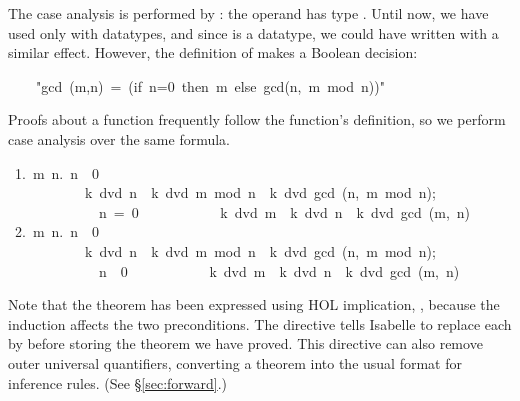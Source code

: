 The case analysis is performed by : the operand has type
.  Until now, we have used  only with datatypes, and since
 is a datatype, we could have written
 with a similar effect.  However, the definition of 
makes a Boolean decision:
\begin{isabelle}
\ \ \ \ "gcd\ (m,n)\ =\ (if\ n=0\ then\ m\ else\ gcd(n,\ m\ mod\ n))"
\end{isabelle}
Proofs about a function frequently follow the function's definition, so we perform
case analysis over the same formula.

\begingroup\samepage
\begin{isabelle}
\ 1.\ \isasymAnd m\ n.\ \isasymlbrakk n\ \isasymnoteq \ 0\ \isasymlongrightarrow \isanewline
\ \ \ \ \ \ \ \ \ \ \ k\ dvd\ n\ \isasymlongrightarrow \ k\ dvd\ m\ mod\ n\ \isasymlongrightarrow \ k\ dvd\ gcd\ (n,\ m\ mod\ n);\isanewline
\ \ \ \ \ \ \ \ \ \ \ \ \ n\ =\ 0\isasymrbrakk \isanewline
\ \ \ \ \ \ \ \ \ \ \isasymLongrightarrow \ k\ dvd\ m\ \isasymlongrightarrow \ k\ dvd\ n\ \isasymlongrightarrow \ k\ dvd\ gcd\ (m,\ n)
\pagebreak[0]\isanewline
\ 2.\ \isasymAnd m\ n.\ \isasymlbrakk n\ \isasymnoteq \ 0\ \isasymlongrightarrow \isanewline
\ \ \ \ \ \ \ \ \ \ \ k\ dvd\ n\ \isasymlongrightarrow \ k\ dvd\ m\ mod\ n\ \isasymlongrightarrow \ k\ dvd\ gcd\ (n,\ m\ mod\ n);\isanewline
\ \ \ \ \ \ \ \ \ \ \ \ \ n\ \isasymnoteq \ 0\isasymrbrakk \isanewline
\ \ \ \ \ \ \ \ \ \ \isasymLongrightarrow \ k\ dvd\ m\ \isasymlongrightarrow \ k\ dvd\ n\ \isasymlongrightarrow \ k\ dvd\ gcd\ (m,\ n)
\end{isabelle}
\endgroup

\begin{warn}
Note that the theorem has been expressed using HOL implication,
\isa{\isasymlongrightarrow}, because the induction affects the two
preconditions.  The directive  tells Isabelle to replace
each \isa{\isasymlongrightarrow} by \isa{\isasymLongrightarrow} before
storing the theorem we have proved.  This directive can also remove outer
universal quantifiers, converting a theorem into the usual format for
inference rules.  (See \S\ref{sec:forward}.)
\end{warn}

